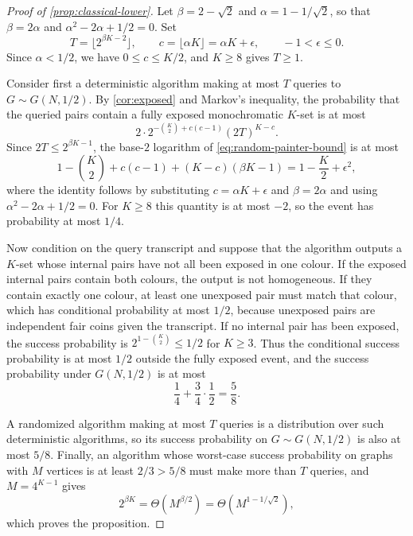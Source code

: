 \begin{proof}[Proof of \cref{prop:classical-lower}]
Let $\beta=2-\sqrt2$ and $\alpha=1-1/\sqrt2$, so that $\beta=2\alpha$ and
$\alpha^2-2\alpha+1/2=0$.  Set
\[
 T=\bigl\lfloor2^{\beta K-2}\bigr\rfloor,
 \qquad
 c=\lfloor\alpha K\rfloor=\alpha K+\epsilon,
 \qquad -1<\epsilon\le0.
\]
Since $\alpha<1/2$, we have $0\le c\le K/2$, and $K\ge8$ gives $T\ge1$.

Consider first a deterministic algorithm making at most $T$ queries to
$G\sim G(N,1/2)$.  By \cref{cor:exposed} and Markov's inequality, the
probability that the queried pairs contain a fully exposed monochromatic
$K$-set is at most
\begin{equation}\label{eq:random-painter-bound}
 2\cdot
 2^{-\binom K2+c(c-1)}(2T)^{K-c}.
\end{equation}
Since $2T\le2^{\beta K-1}$, the base-$2$ logarithm of
\cref{eq:random-painter-bound} is at most
\[
 1-\binom K2+c(c-1)+(K-c)(\beta K-1)
 =1-\frac K2+\epsilon^2,
\]
where the identity follows by substituting $c=\alpha K+\epsilon$ and
$\beta=2\alpha$ and using $\alpha^2-2\alpha+1/2=0$.  For $K\ge8$ this
quantity is at most $-2$, so the event has probability at most $1/4$.

Now condition on the query transcript and suppose that the algorithm
outputs a $K$-set whose internal pairs have not all been exposed in one
colour.  If the exposed internal pairs contain both colours, the output is
not homogeneous.  If they contain exactly one colour, at least one
unexposed pair must match that colour, which has conditional probability at
most $1/2$, because unexposed pairs are independent fair coins given the
transcript.  If no internal pair has been exposed, the success probability
is $2^{1-\binom K2}\le1/2$ for $K\ge3$.  Thus the conditional success
probability is at most $1/2$ outside the fully exposed event, and the
success probability under $G(N,1/2)$ is at most
\[
 \frac14+\frac34\cdot\frac12=\frac58.
\]

A randomized algorithm making at most $T$ queries is a distribution over
such deterministic algorithms, so its success probability on
$G\sim G(N,1/2)$ is also at most $5/8$.  Finally, an algorithm whose
worst-case success probability on graphs with $M$ vertices is at least
$2/3>5/8$ must make more than $T$ queries, and $M=4^{K-1}$ gives
\[
 2^{\beta K}
 =\Theta\!\left(M^{\beta/2}\right)
 =\Theta\!\left(M^{1-1/\sqrt2}\right),
\]
which proves the proposition.
\end{proof}

